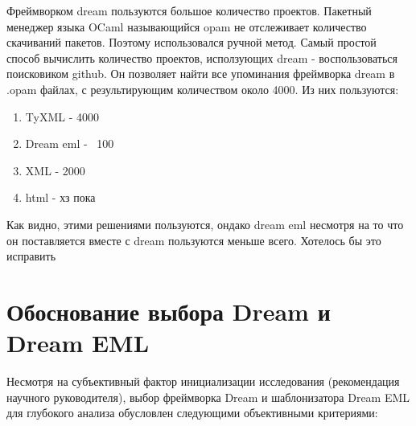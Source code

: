 
Фреймворком dream пользуются большое количество проектов.
Пакетный менеджер языка OCaml называющийся opam не отслеживает количество скачиваний пакетов. Поэтому использовался ручной метод.
Самый простой способ вычислить количество проектов, исползующих dream - воспользоваться поисковиком github.
Он позволяет найти все упоминания фреймворка dream в .opam файлах, с результирующим количеством около 4000.
Из них пользуются:

\begin{enumerate}
    \item TyXML - 4000
    \item Dream eml - ~100
    \item XML - 2000
    \item html - хз пока
\end{enumerate}


Как видно, этими решениями пользуются, ондако dream eml несмотря на то что он поставляется вместе с dream пользуются меньше всего.
Хотелось бы это исправить


\section*{Обоснование выбора Dream и Dream EML}
Несмотря на субъективный фактор инициализации исследования (рекомендация научного руководителя), выбор фреймворка Dream и шаблонизатора Dream EML для глубокого анализа обусловлен следующими объективными критериями:

